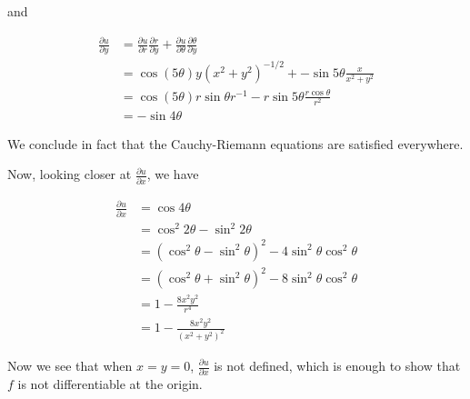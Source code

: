\documentclass[a4paper]{article}
\begin{document}
\begin{enumerate}
	and 
	
	\begin{align*}
	\frac{\partial u }{\partial y} & = \frac{\partial u }{\partial r} \frac{\partial r}{\partial y} + \frac{\partial u }{\partial \theta} \frac{\partial \theta}{\partial y} \\
	& = \cos (5 \theta) y (x^{2} + y^{2})^{-1/2} + - \sin 5 \theta \frac{x}{x^{2} + y^{2}} \\
	& = \cos (5 \theta) r \sin \theta r^{-1} - r \sin 5 \theta \frac{r \cos \theta}{r^{2}} \\
	& = -  \sin 4 \theta
	\end{align*}
	
	We conclude in fact that the Cauchy-Riemann equations are satisfied everywhere. 
	
	Now, looking closer at $ \frac{\partial u }{\partial x} $, we have 
	
	\begin{align*}
	\frac{\partial u }{\partial x} & = \cos 4 \theta \\
	& = \cos^{2} 2\theta - \sin^{2} 2 \theta \\
	& = ( \cos^{2} \theta - \sin^{2} \theta )^{2} - 4 \sin^{2} \theta \cos^{2} \theta \\
	& = ( \cos^{2} \theta + \sin^{2} \theta )^{2} - 8 \sin^{2} \theta \cos^{2} \theta \\
	& = 1 - \frac{8x^{2}y^{2}}{r^{4}} \\
	& = 1 - \frac{8x^{2}y^{2}}{(x^{2} + y^{2})^{2}}
 	\end{align*}
 	
 	Now we see that when $ x = y = 0 $, $ \frac{\partial u }{\partial x} $ is not defined, which is enough to show that $ f $ is not differentiable at the origin.
	
	
	
	
	

\end{enumerate}
\end{document}
